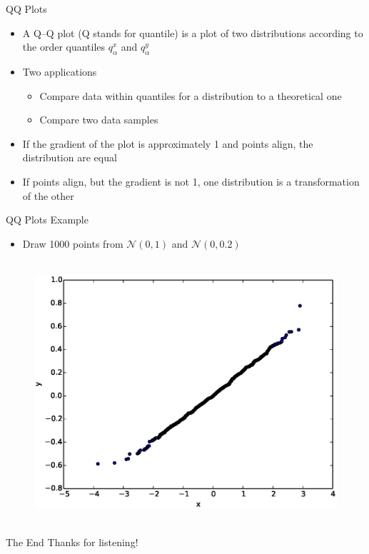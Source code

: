 \documentclass{beamer}
\begin{document}
\begin{frame}{QQ Plots} 
\begin{itemize}
 \item A Q–Q plot (Q stands for quantile) is a plot of two distributions according to the order quantiles $q_\alpha^x$ and $q_\alpha^y$
 \item Two applications 
 \begin{itemize}
 \item Compare data within quantiles for a distribution to a theoretical one 
 \item Compare two data samples 
 \end{itemize}
 \item If the gradient of the plot is approximately 1 and points align, the distribution are equal 
 \item If points align, but the gradient is not 1, one distribution is a transformation of the other 
\end{itemize}
\end{frame}

\begin{frame}{QQ Plots Example}  
\begin{itemize}
 \item Draw 1000 points from $\mathcal{N}(0, 1)$ and $\mathcal{N}(0, 0.2)$ 
\end{itemize}

   \begin{figure}[htp]
\mbox{
\includegraphics[width=0.5\linewidth]{QQPlot.eps}
}
\end{figure} 
\end{frame}

\begin{frame}{The End} 
Thanks for listening!  
\end{frame}
\end{document}
